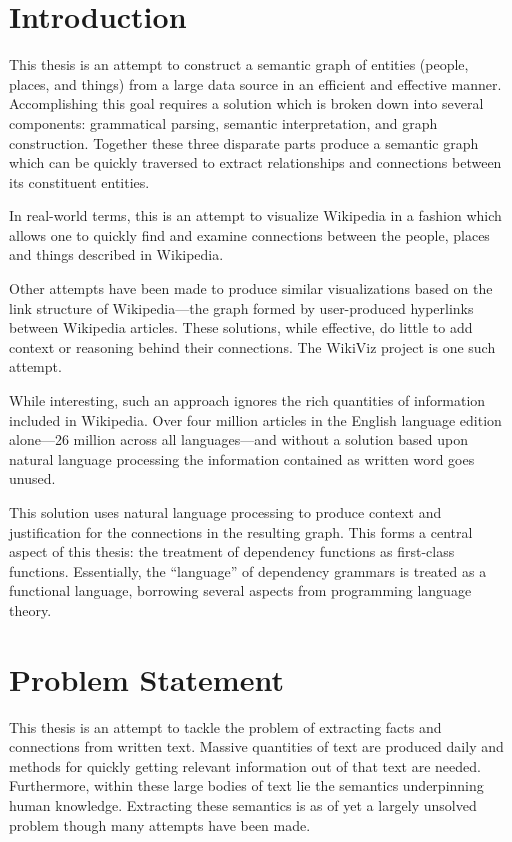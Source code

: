 \chapter{Introduction}

This thesis is an attempt to construct a semantic graph of entities (people, places, and things) from a large data source in an efficient and effective manner.  Accomplishing this goal requires a solution which is broken down into several components: grammatical parsing, semantic interpretation, and graph construction.  Together these three disparate parts produce a semantic graph which can be quickly traversed to extract relationships and connections between its constituent entities.

In real-world terms, this is an attempt to visualize Wikipedia in a fashion which allows one to quickly find and examine connections between the people, places and things described in Wikipedia.

Other attempts have been made to produce similar visualizations based on the link structure of Wikipedia---the graph formed by user-produced hyperlinks between Wikipedia articles.  These solutions, while effective, do little to add context or reasoning behind their connections.  The WikiViz project \cite{wikiviz} is one such attempt.

While interesting, such an approach ignores the rich quantities of information included in Wikipedia.  Over four million articles in the English language edition alone---26 million across all languages---and without a solution based upon natural language processing the information contained as written word goes unused.  

This solution uses natural language processing to produce context and justification for the connections in the resulting graph.  This forms a central aspect of this thesis: the treatment of dependency functions as first-class functions.  Essentially, the ``language'' of dependency grammars is treated as a functional language, borrowing several aspects from programming language theory.  
 
\chapter{Problem Statement}

This thesis is an attempt to tackle the problem of extracting facts and connections from written text.  Massive quantities of text are produced daily and methods for quickly getting relevant information out of that text are needed.  Furthermore, within these large bodies of text lie the semantics underpinning human knowledge. Extracting these semantics is as of yet a largely unsolved problem though many attempts have been made. 

